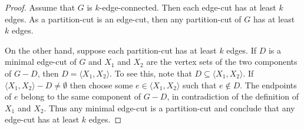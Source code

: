 \begin{proof}
Assume that $G$ is $k$-edge-connected. Then each edge-cut has at least
$k$ edges. As a partition-cut is an edge-cut, then any partition-cut
of $G$ has at least $k$ edges.

On the other hand, suppose each partition-cut has at least $k$
edges. If $D$ is a minimal edge-cut of $G$ and $X_1$ and $X_2$ are the
vertex sets of the two components of $G - D$, then
$D = \langle X_1, X_2 \rangle$. To see this, note that
$D \subseteq \langle X_1, X_2 \rangle$. If
$\langle X_1, X_2 \rangle - D \neq \emptyset$ then choose some
$e \in \langle X_1, X_2 \rangle$ such that $e \notin D$. The endpoints
of $e$ belong to the same component of $G - D$, in contradiction of
the definition of $X_1$ and $X_2$. Thus any minimal edge-cut is a
partition-cut and conclude that any edge-cut has at least $k$ edges.
\end{proof}







